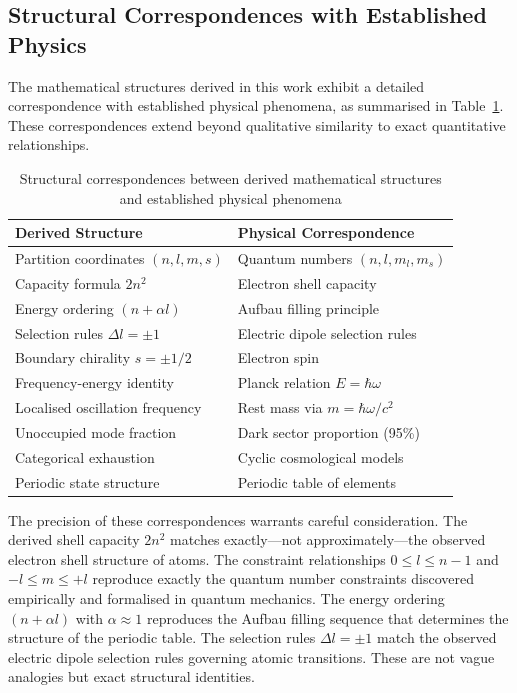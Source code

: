 \documentclass[11pt,a4paper]{article}
\theoremstyle{remark}
\begin{document}
\subsection{Structural Correspondences with Established Physics}

The mathematical structures derived in this work exhibit a detailed correspondence with established physical phenomena, as summarised in Table~\ref{tab:correspondences}. These correspondences extend beyond qualitative similarity to exact quantitative relationships.

\begin{table}[H]
\centering
\caption{Structural correspondences between derived mathematical structures and established physical phenomena}
\label{tab:correspondences}
\begin{tabular}{ll}
\toprule
\textbf{Derived Structure} & \textbf{Physical Correspondence} \\
\midrule
Partition coordinates $(n, l, m, s)$ & Quantum numbers $(n, l, m_l, m_s)$ \\
Capacity formula $2n^2$ & Electron shell capacity \\
Energy ordering $(n + \alpha l)$ & Aufbau filling principle \\
Selection rules $\Delta l = \pm 1$ & Electric dipole selection rules \\
Boundary chirality $s = \pm 1/2$ & Electron spin \\
Frequency-energy identity & Planck relation $E = \hbar\omega$ \\
Localised oscillation frequency & Rest mass via $m = \hbar\omega/c^2$ \\
Unoccupied mode fraction & Dark sector proportion (95\%) \\
Categorical exhaustion & Cyclic cosmological models \\
Periodic state structure & Periodic table of elements \\
\bottomrule
\end{tabular}
\end{table}

The precision of these correspondences warrants careful consideration. The derived shell capacity $2n^2$ matches exactly—not approximately—the observed electron shell structure of atoms. The constraint relationships $0 \leq l \leq n-1$ and $-l \leq m \leq +l$ reproduce exactly the quantum number constraints discovered empirically and formalised in quantum mechanics. The energy ordering $(n + \alpha l)$ with $\alpha \approx 1$ reproduces the Aufbau filling sequence that determines the structure of the periodic table. The selection rules $\Delta l = \pm 1$ match the observed electric dipole selection rules governing atomic transitions. These are not vague analogies but exact structural identities.
\end{document}
